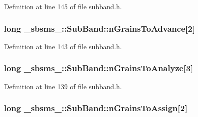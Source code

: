 Definition at line 145 of file subband.\+h.

\subsubsection[{\texorpdfstring{n\+Grains\+To\+Advance}{nGrainsToAdvance}}]{\setlength{\rightskip}{0pt plus 5cm}long \+\_\+sbsms\+\_\+\+::\+Sub\+Band\+::n\+Grains\+To\+Advance\mbox{[}2\mbox{]}\hspace{0.3cm}{\ttfamily [protected]}}\hypertarget{class__sbsms___1_1_sub_band_aac6799c1d1882bb1830ee2bcc872443a}{}\label{class__sbsms___1_1_sub_band_aac6799c1d1882bb1830ee2bcc872443a}


Definition at line 143 of file subband.\+h.

\subsubsection[{\texorpdfstring{n\+Grains\+To\+Analyze}{nGrainsToAnalyze}}]{\setlength{\rightskip}{0pt plus 5cm}long \+\_\+sbsms\+\_\+\+::\+Sub\+Band\+::n\+Grains\+To\+Analyze\mbox{[}3\mbox{]}\hspace{0.3cm}{\ttfamily [protected]}}\hypertarget{class__sbsms___1_1_sub_band_ab803c0869c44c07fd8681c7e1eb8fa68}{}\label{class__sbsms___1_1_sub_band_ab803c0869c44c07fd8681c7e1eb8fa68}


Definition at line 139 of file subband.\+h.

\subsubsection[{\texorpdfstring{n\+Grains\+To\+Assign}{nGrainsToAssign}}]{\setlength{\rightskip}{0pt plus 5cm}long \+\_\+sbsms\+\_\+\+::\+Sub\+Band\+::n\+Grains\+To\+Assign\mbox{[}2\mbox{]}\hspace{0.3cm}{\ttfamily [protected]}}\hypertarget{class__sbsms___1_1_sub_band_afae9ab227670db58e9f1003606fe15aa}{}\label{class__sbsms___1_1_sub_band_afae9ab227670db58e9f1003606fe15aa}


